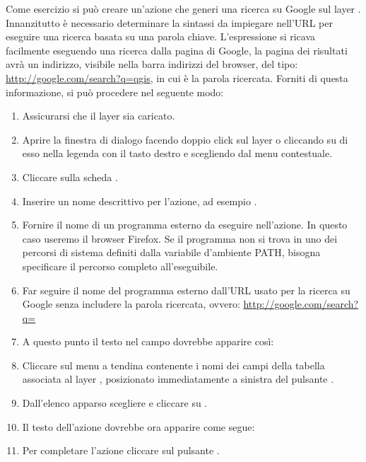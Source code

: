 Come esercizio si può creare un'azione che generi una ricerca su Google sul
layer . Innanzitutto è necessario determinare la sintassi da
impiegare nell'URL per eseguire una ricerca basata su una parola chiave.
L'espressione si ricava facilmente eseguendo una ricerca dalla pagina di
Google, la pagina dei risultati avrà un indirizzo, visibile nella barra
indirizzi del browser, del tipo: \url{http://google.com/search?q=qgis},
in cui  è la parola ricercata. Forniti di questa informazione,
si può procedere nel seguente modo:

\begin{enumerate}
\item Assicurarsi che il layer  sia caricato.
\item Aprire la finestra di dialogo  facendo
doppio click sul layer o cliccando su di esso nella legenda con il tasto
destro e scegliendo   dal menu contestuale.
\item Cliccare sulla scheda .
\item Inserire un nome descrittivo per l'azione, ad esempio .
\item Fornire il nome di un programma esterno da eseguire nell'azione. In
questo caso useremo il browser Firefox. Se il programma non si trova in uno
dei percorsi di sistema definiti dalla variabile d'ambiente PATH, bisogna
specificare il percorso completo all'eseguibile.
\item Far seguire il nome del programma esterno dall'URL usato per la ricerca
su Google senza includere la parola ricercata, ovvero:
  \url{http://google.com/search?q=}
\item A questo punto il testo nel campo  dovrebbe apparire
così:\\
\item Cliccare sul menu a tendina contenente i nomi dei campi della tabella
associata al layer , posizionato immediatamente a sinistra del
pulsante .
\item Dall'elenco apparso scegliere  e cliccare su .
\item Il testo dell'azione dovrebbe ora apparire come segue:\\ 
\item Per completare l'azione cliccare sul pulsante .
\end{enumerate}
 
